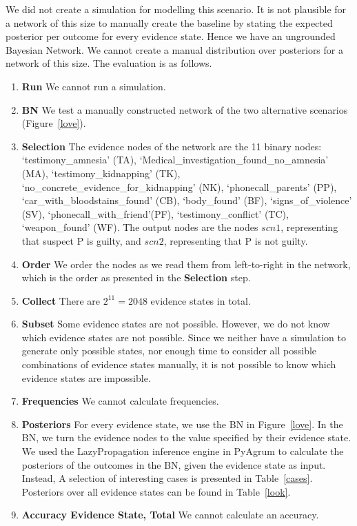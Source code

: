 \documentclass[12pt]{article}
\begin{document}
We did not create a simulation for modelling this scenario. It is not plausible for a network of this size to manually create the baseline by stating the expected posterior per outcome for every evidence state. Hence we have an ungrounded Bayesian Network. We cannot create a manual distribution over posteriors for a network of this size. The evaluation is as follows.

\begin{enumerate}
\item \textbf{Run} We cannot run a simulation.
\item \textbf{BN} We test a manually constructed network of the two alternative scenarios (Figure~\ref{love}).
\item \textbf{Selection} The evidence nodes of the network are the 11 binary nodes: `testimony\_amnesia' (TA), `Medical\_investigation\_found\_no\_amnesia' (MA), `testimony\_kidnapping' (TK), `no\_concrete\_evidence\_for\_kidnapping' (NK),
 `phonecall\_parents' (PP),  `car\_with\_bloodstains\_found' (CB), `body\_found' (BF), `signs\_of\_violence' (SV), `phonecall\_with\_friend'(PF), `testimony\_conflict' (TC), `weapon\_found' (WF). The output nodes are the nodes $scn1$, representing that suspect P is guilty, and $scn2$, representing that P is not guilty.
\item \textbf{Order} We order the nodes as we read them from left-to-right in the network, which is the order as presented in the \textbf{Selection} step.
\item \textbf{Collect} There are $2^{11} = 2048$ evidence states in total.
\item \textbf{Subset} Some evidence states are not possible. However, we do not know which evidence states are not possible. Since we neither have a simulation to generate only possible states, nor enough time to consider all possible combinations of evidence states manually, it is not possible to know which evidence states are impossible.
\item \textbf{Frequencies} We cannot calculate frequencies.
\item \textbf{Posteriors} For every evidence state, we use the BN in Figure~\ref{love}. In the BN, we turn the evidence nodes to the value specified by their evidence state. We used the LazyPropagation inference engine in PyAgrum to calculate the posteriors of the outcomes in the BN, given the evidence state as input. Instead, A selection of interesting cases is presented in Table~\ref{cases}. Posteriors over all evidence states can be found in Table~\ref{look}.
\item \textbf{Accuracy Evidence State, Total} We cannot calculate an accuracy.
\end{enumerate}
\end{document}
